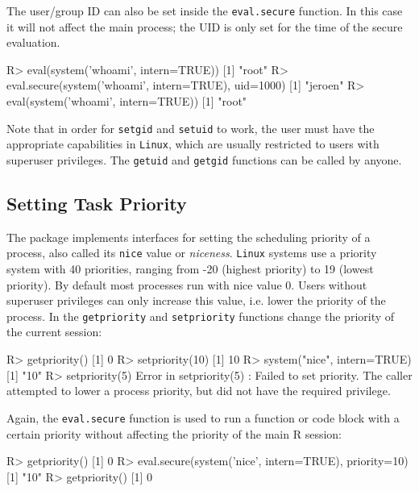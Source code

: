 \documentclass{jss}
\newcommand{\R}{\textsf{R}\xspace}
\newcommand{\RAppArmor}{\pkg{RAppArmor}\xspace}
\newcommand{\Linux}{\texttt{Linux}\xspace}
\begin{document}
The user/group ID can also be set inside the \texttt{eval.secure} function. In
this case it will not affect the main process; the UID is only set for the time
of the secure evaluation.

\begin{CodeChunk}
\begin{CodeInput}
R> eval(system('whoami', intern=TRUE))
[1] "root"
R> eval.secure(system('whoami', intern=TRUE), uid=1000)
[1] "jeroen"
R> eval(system('whoami', intern=TRUE))
[1] "root"
\end{CodeInput}
\end{CodeChunk}

Note that in order for \texttt{setgid} and \texttt{setuid} to work, the user
must have the appropriate capabilities in \Linux, which are usually
restricted to users with superuser privileges. The \texttt{getuid} and
\texttt{getgid} functions can be called by anyone.

\subsection{Setting Task Priority}
\label{priority}

The \RAppArmor package implements interfaces for setting the scheduling priority
of a process, also called its \texttt{nice} value or \emph{niceness}. \Linux
systems use a priority system with 40 priorities, ranging from -20 (highest
priority) to 19 (lowest priority). By default most processes run with nice
value 0. Users without superuser privileges can only increase this value, i.e.
lower the priority of the process. In \RAppArmor the \texttt{getpriority} and
\texttt{setpriority} functions change the priority of the current session:

\begin{CodeChunk}
\begin{CodeInput}
R> getpriority()
[1] 0
R> setpriority(10)
[1] 10
R> system("nice", intern=TRUE)
[1] "10"
R> setpriority(5)
Error in setpriority(5) : 
  Failed to set priority. The caller attempted to lower a process priority, 
  but did not have the required privilege.
\end{CodeInput}
\end{CodeChunk}

Again, the \texttt{eval.secure} function is used to run a function or code block
with a certain priority without affecting the priority of the main \R session:

\begin{CodeChunk}
\begin{CodeInput}
R> getpriority()
[1] 0
R> eval.secure(system('nice', intern=TRUE), priority=10)
[1] "10"
R> getpriority()
[1] 0
\end{CodeInput}
\end{CodeChunk}
\end{document}
